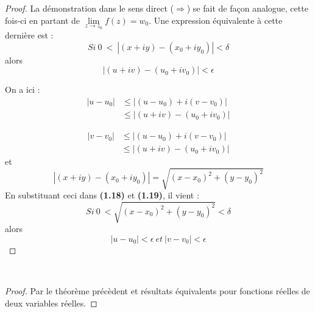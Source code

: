 \begin{proof}
    
    La démonstration dans le sens direct ($\Rightarrow$) se fait de façon analogue, cette fois-ci
    en partant de $\lim\limits_{z\rightarrow z_0} f(z) = w_0$. Une expression équivalente à cette
    dernière est :
    \begin{equation}
    Si\ 0\ <\ |(x+iy) - (x_0+iy_0)|<\delta
    \end{equation}
    alors
    \begin{equation}
    |(u+iv)-(u_0+iv_0)|<\epsilon
    \end{equation}
    
    On a ici :
    \begin{equation}
       \begin{array}{cc}
    |u-u_0| &\leq |(u-u_0)+i(v-v_0)|\\
    \ &\leq |(u+iv)-(u_0+iv_0)|
    \end{array}
    \end{equation}
    
    \begin{equation}
    \begin{array}{cc}
    |v-v_0| &\leq  |(u-u_0)+i(v-v_0)|\\
    \ & \leq |(u+iv)-(u_0+iv_0)|
    \end{array}
    \end{equation}
    et
    \begin{equation}
    |(x+iy) - (x_0+iy_0)| = \sqrt{(x-x_0)^2+(y-y_0)^2}
    \end{equation}
    En substituant ceci dans \textbf{(1.18)} et \textbf{(1.19)}, il vient :
    \begin{equation}
    Si\ 0\ < \sqrt{(x-x_0)^2+(y-y_0)^2} < \delta
    \end{equation}
    alors
    \begin{equation}
    |u-u_0| < \epsilon\ et\ |v-v_0|<\epsilon
    \end{equation}
    \end{proof}
    
    
    \ \\
    \begin{proof}
    Par le théorème précèdent et résultats équivalents pour fonctions réelles de deux variables
    réelles.
    \end{proof}
    
